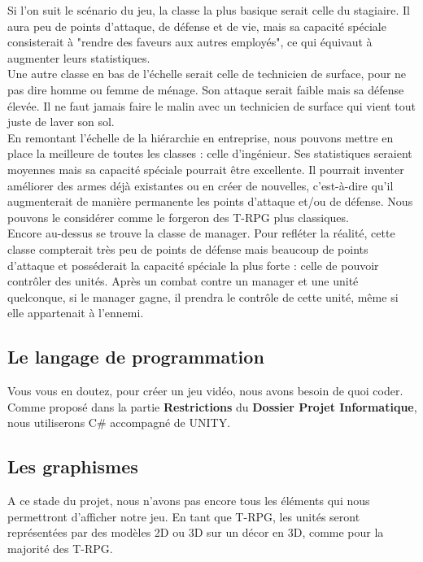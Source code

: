 \documentclass{article}
\begin{document}
Si l'on suit le scénario du jeu, la classe la plus basique serait celle du stagiaire. Il aura peu de points d'attaque, de défense et de vie, mais sa capacité spéciale consisterait à "rendre des faveurs aux autres employés", ce qui équivaut à augmenter leurs statistiques.\\

Une autre classe en bas de l'échelle serait celle de technicien de surface, pour ne pas dire homme ou femme de ménage. Son attaque serait faible mais sa défense élevée. Il ne faut jamais faire le malin avec un technicien de surface qui vient tout juste de laver son sol.\\

En remontant l'échelle de la hiérarchie en entreprise, nous pouvons mettre en place la meilleure de toutes les classes : celle d'ingénieur. Ses statistiques seraient moyennes mais sa capacité spéciale pourrait être excellente. Il pourrait inventer améliorer des armes déjà existantes ou en créer de nouvelles, c'est-à-dire qu'il augmenterait de manière permanente les points d'attaque et/ou de défense. Nous pouvons le considérer comme le forgeron des T-RPG plus classiques.\\ 

Encore au-dessus se trouve la classe de manager. Pour refléter la réalité, cette classe compterait très peu de points de défense mais beaucoup de points d'attaque et posséderait la capacité spéciale la plus forte : celle de pouvoir contrôler des unités. Après un combat contre un manager et une unité quelconque, si le manager gagne, il prendra le contrôle de cette unité, même si elle appartenait à l'ennemi. 

\subsection{Le langage de programmation}
Vous vous en doutez, pour créer un jeu vidéo, nous avons besoin de quoi coder. Comme proposé dans la partie \textbf{Restrictions} du \textbf{Dossier Projet Informatique}, nous utiliserons C\# accompagné de UNITY. 

\subsection{Les graphismes}
A ce stade du projet, nous n'avons pas encore tous les éléments qui nous permettront d'afficher notre jeu. En tant que T-RPG, les unités seront représentées par des modèles 2D ou 3D sur un décor en 3D, comme pour la majorité des T-RPG.
\end{document}
